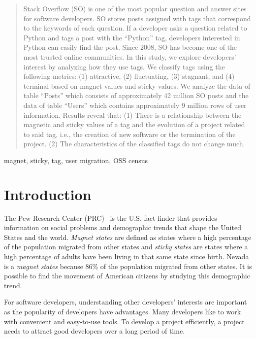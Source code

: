 \documentclass[conference]{IEEEtran}
\begin{document}
\maketitle

\begin{abstract}
Stack Overflow (SO) is one of the most popular question and answer sites for software developers. SO stores posts assigned with tags that correspond to the keywords of each question. If a developer asks a question related to Python and tags a post with the ``Python'' tag, developers interested in Python can easily find the post. Since 2008, SO has become one of the most trusted online communities. In this study, we explore developers' interest by analyzing how they use tags. We classify tags using the following metrics: (1) attractive, (2) fluctuating, (3) stagnant, and (4) terminal based on magnet values and sticky values. We analyze the data of table ``Posts'' which consists of approximately 42 million SO posts and the data of table ``Users'' which contains approximately 9 million rows of user information. Results reveal that: (1) There is a relationship between the magnetic and sticky values of a tag and the evolution of a project related to said tag, i.e., the creation of new software or the termination of the project. (2) The characteristics of the classified tags do not change much.
\end{abstract}

\begin{IEEEkeywords}
magnet, sticky, tag, user migration, OSS census
\end{IEEEkeywords}

\section{Introduction}
The Pew Research Center (PRC)~\cite{communityeconomic} is the U.S. fact finder that provides information on social problems and demographic trends that shape the United States and the world.  
\emph{Magnet states} are defined as states where a high percentage of the population migrated from other states and \emph{sticky states} are states where a high percentage of adults have been living in that same state since birth. 
Nevada is a \emph{magnet states} because  86\% of the population migrated from other states. It is possible to find the movement of American citizens by studying this demographic trend.

For software developers, understanding other developers' interests are important as the popularity of developers have advantages. Many developers like to work with convenient and easy-to-use tools. To develop a project efficiently, a project needs to attract good developers over a long period of time.
\end{document}
